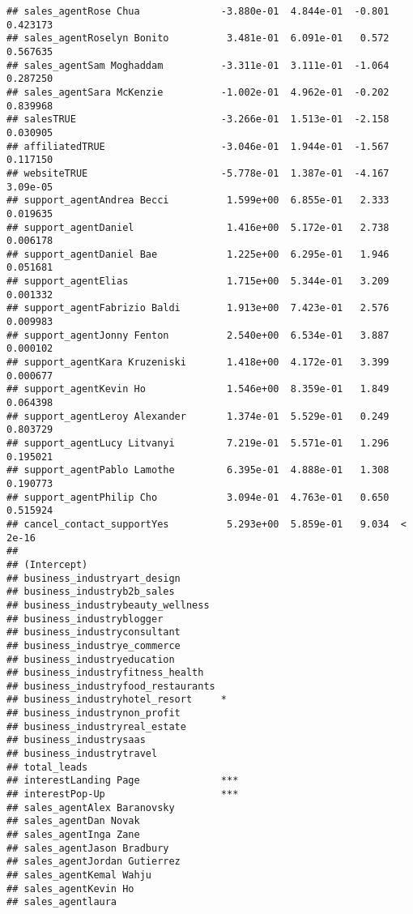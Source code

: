 \documentclass[]{article}
\begin{document}
\begin{verbatim}
## sales_agentRose Chua              -3.880e-01  4.844e-01  -0.801 0.423173
## sales_agentRoselyn Bonito          3.481e-01  6.091e-01   0.572 0.567635
## sales_agentSam Moghaddam          -3.311e-01  3.111e-01  -1.064 0.287250
## sales_agentSara McKenzie          -1.002e-01  4.962e-01  -0.202 0.839968
## salesTRUE                         -3.266e-01  1.513e-01  -2.158 0.030905
## affiliatedTRUE                    -3.046e-01  1.944e-01  -1.567 0.117150
## websiteTRUE                       -5.778e-01  1.387e-01  -4.167 3.09e-05
## support_agentAndrea Becci          1.599e+00  6.855e-01   2.333 0.019635
## support_agentDaniel                1.416e+00  5.172e-01   2.738 0.006178
## support_agentDaniel Bae            1.225e+00  6.295e-01   1.946 0.051681
## support_agentElias                 1.715e+00  5.344e-01   3.209 0.001332
## support_agentFabrizio Baldi        1.913e+00  7.423e-01   2.576 0.009983
## support_agentJonny Fenton          2.540e+00  6.534e-01   3.887 0.000102
## support_agentKara Kruzeniski       1.418e+00  4.172e-01   3.399 0.000677
## support_agentKevin Ho              1.546e+00  8.359e-01   1.849 0.064398
## support_agentLeroy Alexander       1.374e-01  5.529e-01   0.249 0.803729
## support_agentLucy Litvanyi         7.219e-01  5.571e-01   1.296 0.195021
## support_agentPablo Lamothe         6.395e-01  4.888e-01   1.308 0.190773
## support_agentPhilip Cho            3.094e-01  4.763e-01   0.650 0.515924
## cancel_contact_supportYes          5.293e+00  5.859e-01   9.034  < 2e-16
##                                      
## (Intercept)                          
## business_industryart_design          
## business_industryb2b_sales           
## business_industrybeauty_wellness     
## business_industryblogger             
## business_industryconsultant          
## business_industrye_commerce          
## business_industryeducation           
## business_industryfitness_health      
## business_industryfood_restaurants    
## business_industryhotel_resort     *  
## business_industrynon_profit          
## business_industryreal_estate         
## business_industrysaas                
## business_industrytravel              
## total_leads                          
## interestLanding Page              ***
## interestPop-Up                    ***
## sales_agentAlex Baranovsky           
## sales_agentDan Novak                 
## sales_agentInga Zane                 
## sales_agentJason Bradbury            
## sales_agentJordan Gutierrez          
## sales_agentKemal Wahju               
## sales_agentKevin Ho                  
## sales_agentlaura                     

\end{verbatim}
\end{document}
